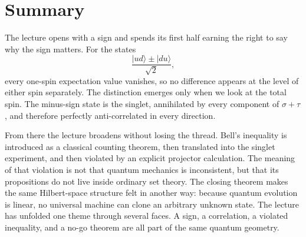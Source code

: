 \section{Summary}

The lecture opens with a sign and spends its first half earning the right to say why the sign matters. For the states
\[
\frac{|ud\rangle\pm|du\rangle}{\sqrt{2}},
\]
every one-spin expectation value vanishes, so no difference appears at the level of either spin separately. The distinction emerges only when we look at the total spin. The minus-sign state is the singlet, annihilated by every component of \(\sigma+\tau\), and therefore perfectly anti-correlated in every direction.

From there the lecture broadens without losing the thread. Bell's inequality is introduced as a classical counting theorem, then translated into the singlet experiment, and then violated by an explicit projector calculation. The meaning of that violation is not that quantum mechanics is inconsistent, but that its propositions do not live inside ordinary set theory. The closing theorem makes the same Hilbert-space structure felt in another way: because quantum evolution is linear, no universal machine can clone an arbitrary unknown state. The lecture has unfolded one theme through several faces. A sign, a correlation, a violated inequality, and a no-go theorem are all part of the same quantum geometry.